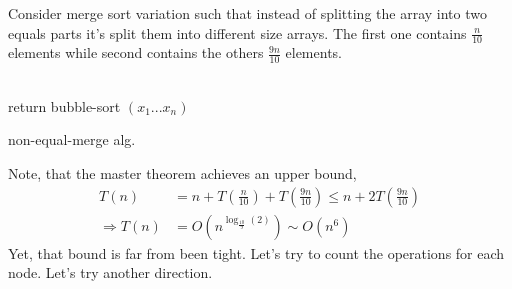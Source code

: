 \begin{example}
Consider merge sort variation such that instead of splitting the array into two equals parts it's split them into different size arrays. The first one contains \( \frac{n}{10} \) elements while second contains the others \( \frac{9n}{10}\) elements.

%
\begin{algorithm}
\SetAlgoLined
{}
 \ \\ 
    { return bubble-sort \( (x_1 ... x_n)\) } 
 \ \\ 
 
 \caption{non-equal-merge alg.} 
\label{alg:unmerge}
\end{algorithm}
%
Note, that the master theorem achieves an upper bound, 
\begin{equation*}
    \begin{split}
    T\left(n\right) & = n +  T\left(\frac{n}{10}\right) + T\left(\frac{9n}{10}\right) \le n +  2 T\left(\frac{9n}{10}\right) \\
     \Rightarrow  T\left(n\right) & = O \left( n^{\log_{\frac{10}{9}}\left(2\right)} \right) \sim O \left( n^{ 6 } \right)  
    \end{split}
\end{equation*}
Yet, that bound is far from been tight. Let's try to count the operations for each node. Let's try another direction. 


\end{example}
